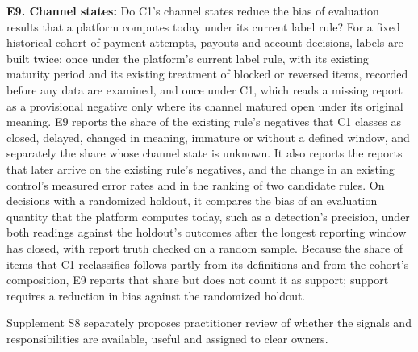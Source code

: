 \documentclass[
  11pt,
]{article}
\begin{document}
\textbf{E9. Channel states:} Do C1's channel states reduce the bias of
evaluation results that a platform computes today under its current
label rule? For a fixed historical cohort of payment attempts, payouts
and account decisions, labels are built twice: once under the platform's
current label rule, with its existing maturity period and its existing
treatment of blocked or reversed items, recorded before any data are
examined, and once under C1, which reads a missing report as a
provisional negative only where its channel matured open under its
original meaning. E9 reports the share of the existing rule's negatives
that C1 classes as closed, delayed, changed in meaning, immature or
without a defined window, and separately the share whose channel state
is unknown. It also reports the reports that later arrive on the
existing rule's negatives, and the change in an existing control's
measured error rates and in the ranking of two candidate rules. On
decisions with a randomized holdout, it compares the bias of an
evaluation quantity that the platform computes today, such as a
detection's precision, under both readings against the holdout's
outcomes after the longest reporting window has closed, with report
truth checked on a random sample. Because the share of items that C1
reclassifies follows partly from its definitions and from the cohort's
composition, E9 reports that share but does not count it as support;
support requires a reduction in bias against the randomized holdout.

Supplement S8 separately proposes practitioner review of whether the
signals and responsibilities are available, useful and assigned to clear
owners.
\end{document}
